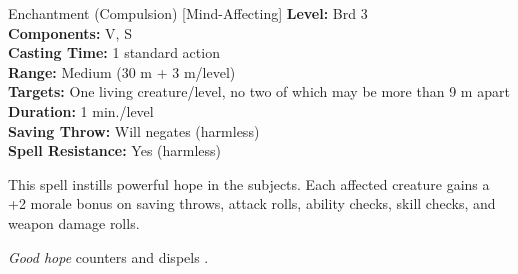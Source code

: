 {Enchantment (Compulsion) [Mind-Affecting]}
{
	\textbf{Level:}
	Brd 3\\
	\textbf{Components:}
	V, S\\
	\textbf{Casting Time:}
	1 standard action\\
	\textbf{Range:}
	Medium (30 m + 3 m/level)\\
	\textbf{Targets:}
	One living creature/level, no two of which may be more than 9 m apart\\
	\textbf{Duration:}
	1 min./level\\
	\textbf{Saving Throw:}
	Will negates (harmless)\\
	\textbf{Spell Resistance:}
	Yes (harmless)\\
}
{
	This spell instills powerful hope in the subjects. Each affected creature gains a +2 morale bonus on saving throws, attack rolls, ability checks, skill checks, and weapon damage rolls.

	\emph{Good hope} counters and dispels .

}

